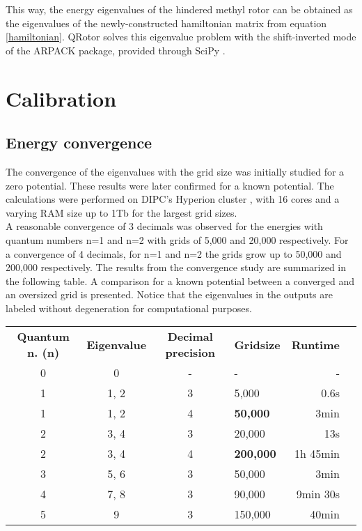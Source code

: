 \documentclass[12pt,a4paper]{article}
\begin{document}
This way, the energy eigenvalues of the hindered methyl rotor can be obtained as the eigenvalues of the newly-constructed hamiltonian matrix from equation \eqref{hamiltonian}. QRotor solves this eigenvalue problem with the shift-inverted mode of the ARPACK package, provided through SciPy \cite{arpack}.


\section{Calibration}


\subsection{Energy convergence}


The convergence of the eigenvalues with the grid size was initially studied for a zero potential. These results were later confirmed for a known potential. The calculations were performed on DIPC's Hyperion cluster \cite{hyperion}, with 16 cores and a varying RAM size up to 1Tb for the largest grid sizes.\\

A reasonable convergence of 3 decimals was observed for the energies with quantum numbers n=1 and n=2 with grids of 5,000 and 20,000 respectively. For a convergence of 4 decimals, for n=1 and n=2 the grids grow up to 50,000 and 200,000 respectively. The results from the convergence study are summarized in the following table. A comparison for a known potential \cite{titov2023} between a converged and an oversized grid is presented. Notice that the eigenvalues in the outputs are labeled without degeneration for computational purposes.

\begin{table}[H]
    \centering
    \begin{tabular}{ccclrr}
        \textbf{Quantum n. (n)} & \textbf{Eigenvalue} & \textbf{Decimal precision} & \textbf{Gridsize} & \textbf{Runtime} \\
        0  & 0     & -   & -             & -         \\
        1  & 1, 2  & 3   & 5,000         & 0.6s      \\
        1  & 1, 2  & 4   & \bf{50,000}   & 3min      \\
        2  & 3, 4  & 3   & 20,000        & 13s       \\
        2  & 3, 4  & 4   & \bf{200,000}  & 1h 45min  \\
        3  & 5, 6  & 3   & 50,000        & 3min      \\
        4  & 7, 8  & 3   & 90,000        & 9min 30s  \\
        5  & 9     & 3   & 150,000       & 40min
    \end{tabular}
    \end{table}
\end{document}
